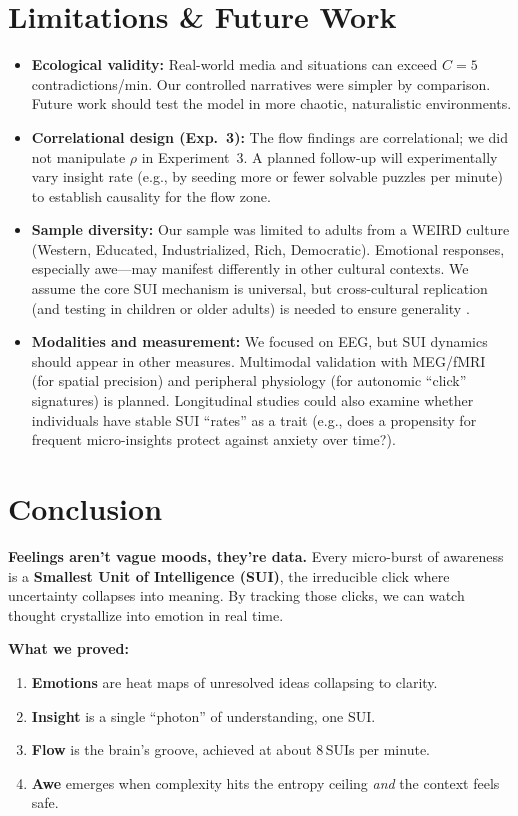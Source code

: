 \documentclass[12pt,a4paper]{article}
\begin{document}
\section{Limitations \& Future Work}
\begin{itemize}[leftmargin=*]
  \item \textbf{Ecological validity:} Real-world media and situations can exceed $C=5$ contradictions/min. Our controlled narratives were simpler by comparison. Future work should test the model in more chaotic, naturalistic environments.
  \item \textbf{Correlational design (Exp.~3):} The flow findings are correlational; we did not manipulate $\rho$ in Experiment~3. A planned follow-up will experimentally vary insight rate (e.g., by seeding more or fewer solvable puzzles per minute) to establish causality for the flow zone.
  \item \textbf{Sample diversity:} Our sample was limited to adults from a WEIRD culture (Western, Educated, Industrialized, Rich, Democratic). Emotional responses, especially awe—may manifest differently in other cultural contexts. We assume the core SUI mechanism is universal, but cross-cultural replication (and testing in children or older adults) is needed to ensure generality \cite{Anderson2024}.
  \item \textbf{Modalities and measurement:} We focused on EEG, but SUI dynamics should appear in other measures. Multimodal validation with MEG/fMRI (for spatial precision) and peripheral physiology (for autonomic “click” signatures) is planned. Longitudinal studies could also examine whether individuals have stable SUI “rates” as a trait (e.g., does a propensity for frequent micro-insights protect against anxiety over time?).
\end{itemize}

\section{Conclusion}

\noindent\textbf{Feelings aren’t vague moods, they’re data.} Every micro-burst of awareness is a \textbf{Smallest Unit of Intelligence (SUI)}, the irreducible click where uncertainty collapses into meaning. By tracking those clicks, we can watch thought crystallize into emotion in real time.

\medskip
\noindent\textbf{What we proved:}
\begin{enumerate}[leftmargin=*,label=\arabic*.]
  \item \textbf{Emotions} are heat maps of unresolved ideas collapsing to clarity.
  \item \textbf{Insight} is a single “photon” of understanding, one SUI.
  \item \textbf{Flow} is the brain’s groove, achieved at about $8$\,SUIs per minute.
  \item \textbf{Awe} emerges when complexity hits the entropy ceiling \emph{and} the context feels safe.
\end{enumerate}
\end{document}
